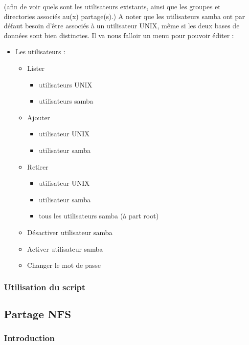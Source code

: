 \documentclass{article}
\begin{document}
	(afin de voir quels sont les utilisateurs existants, ainsi que les groupes et directories associés au(x) partage(s).)
	A noter que les utilisateurs samba ont par défaut besoin d'être associés à un utilisateur UNIX, même si les deux bases de données sont bien distinctes.
	Il va nous falloir un menu pour pouvoir éditer :
	\begin{itemize}
		\item Les utilisateurs :
		\begin{itemize}
			\item[\checkmark] Lister  
			\begin{itemize}
				\item[\checkmark] utilisateurs UNIX
				\item[\checkmark] utilisateurs samba
			\end{itemize}
			\item[\checkmark] Ajouter 
			\begin{itemize}
					\item[\checkmark] utilisateur UNIX
				\item[\checkmark] utilisateur samba 
			\end{itemize}
			\item Retirer
						\begin{itemize}
				\item utilisateur UNIX
				\item[\checkmark] utilisateur samba 
				\item [\checkmark] tous les utilisateurs samba (à part root)
			\end{itemize}
			\item Désactiver utilisateur samba
			\item Activer utilisateur samba
			\item Changer le mot de passe
		\end{itemize}	
	\end{itemize}
	\subsubsection{Utilisation du script}

	\subsection{Partage NFS}
	\subsubsection{Introduction}
\end{document}
